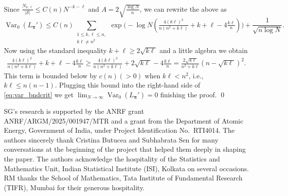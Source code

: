 \documentclass[11pt,reqno,letterpaper]{amsart}
\numberwithin{equation}{section}
\theoremstyle{plain}
\def \bpi{\boldsymbol{\pi}}
\providecommand{\var}{\operatorname{Var}}
\begin{document}
Since $\frac{N_{k, \ell}}{|\mathcal S|} \le C(n) N^{- k - \ell}$ and $A = 2\sqrt{\frac{\log 
N}n}$, we can rewrite %
the above as
\begin{equation}\label{eq:var_bndcrit}
\var_0(L_{\bpi}') \le C(n) \sum_{\substack{1 \le k, \ell \le n,\\ k\ell \ne n^2}} \exp\big(- \log N (\tfrac{4(k\ell)^2}{n(n^2 + k\ell)} + k + \ell  - 4\tfrac{k\ell}n)\big) + \frac 1{\sqrt{n \log N}}.
\end{equation}
Now using the standard inequality $k + \ell \ge 2\sqrt{k \ell}$ and a 
little algebra we obtain
\begin{equation*}
\begin{split}
\tfrac{4(k\ell)^2}{n(n^2 + k\ell)} + k + \ell  - 4\tfrac{k\ell}n \ge \tfrac{4(k\ell)^2}{n(n^2 + k\ell)} + 2\sqrt{k\ell}  - 4\tfrac{k\ell}n = \tfrac{2\sqrt{k\ell}}{n^2 + k\ell} (n - \sqrt{k \ell})^2.
\end{split}
\end{equation*}
This term is bounded below by $c(n) (> 0) $ when $k\ell < n^2$, i.e., $k\ell 
\le n(n-1)$. Plugging this bound into the right-hand side of \eqref{eq:var_bndcrit} we get $\lim_{N \to \infty} \var_0(L_{\bpi}') = 0$ finishing the proof. \qed


\bigskip

 SG's research is supported by the ANRF grant ANRF/ARGM/2025/001947/MTR and a grant from the Department of Atomic Energy, 
Government of India, under Project Identification No.~RTI4014. The authors sincerely thank Cristina Butucea and Subhabrata Sen for many conversations at the beginning of the project that helped them deeply in shaping the paper. The authors acknowledge the hospitality of the Statistics and Mathematics Unit, Indian Statistical Institute (ISI), Kolkata on several occasions. RM thanks the School of Mathematics, Tata Institute of Fundamental Research (TIFR), Mumbai for their generous hospitality.
\end{document}
